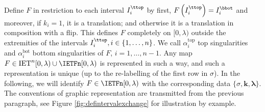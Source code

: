 \documentclass[12pt]{article}
\theoremstyle{definition}
\begin{document}
Define $F$ in restriction to each interval $I_i^{\ttop}$ by first, $F\left(I_i^{\ttop}\right)=I_i^{\bbot}$ and moreover, if $k_i=1$, it is a translation; and otherwise it is a translation in composition with a flip. This defines $F$ completely on $[0, \lambda)$ outside the extremities of the intervals $I_i^{\ttop}, i \in \{1, \ldots, n \}$. We call $\alpha_i^{\mathrm{top}}$ top singularities and $\alpha_i^{\mathrm{bot}}$ bottom singularities of $F$, $i=1, \ldots, n-1$. Any map $F \in \mathrm{IET}^n [0, \lambda) \cup \IETFn [0, \lambda)$ is represented in such a way, and such a representation is unique (up to the re-labelling of the first row in $\sigma$). In the following, we will identify $F \in \IETFn [0, \lambda)$ with the corresponding data $\{\sigma, \boldsymbol{k}, \boldsymbol{\lambda}\}$. The conventions of graphic representation are transmitted from the previous paragraph, see Figure \ref{fig:defintervalexchange} for illustration by example. 
\end{document}
